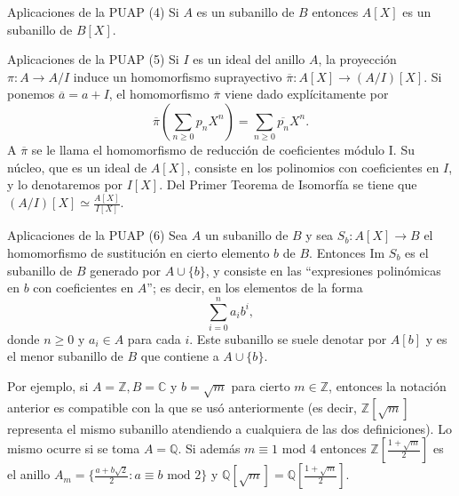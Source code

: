 \begin{example}{Aplicaciones de la PUAP (4)}{}
Si \(A\) es un subanillo de \(B\) entonces \(A[X]\) es un subanillo de \(B[X]\).
\end{example}

\begin{example}{Aplicaciones de la PUAP (5)}{}
Si \(I\) es un ideal del anillo \(A\), la proyección \(\pi : A \to A/I\) induce un homomorfismo suprayectivo \(\overline{\pi} : A[X] \to (A/I)[X]\). Si ponemos \(\overline{a} = a + I\), el homomorfismo \(\overline{\pi}\) viene dado explícitamente por \[\overline{\pi} \left( \sum_{n \geq 0} p_n X^n \right) = \sum_{n \geq 0} \overline{p_n} X^n.\] A \(\overline{\pi}\) se le llama el homomorfismo de reducción de coeficientes módulo I. Su núcleo, que es un ideal de \(A[X]\), consiste en los polinomios con coeficientes en \(I\), y lo denotaremos por \(I[X]\). Del Primer Teorema de Isomorfía se tiene que \((A/I)[X] \simeq \frac{A[X]}{I[X]}.\)
\end{example}

\begin{example}{Aplicaciones de la PUAP (6)}{}
Sea \(A\) un subanillo de \(B\) y sea \(S_b : A[X] \to B\) el homomorfismo de sustitución en cierto elemento \(b\) de \(B\). Entonces Im \(S_b\) es el subanillo de \(B\) generado por \(A \cup \{b\}\), y consiste en las ``expresiones polinómicas en \(b\) con coeficientes en \(A\)''; es decir, en los elementos de la forma \[\sum_{i=0}^{n} a_i b^i,\] donde \(n \geq 0\) y \(a_i \in A\) para cada \(i\). Este subanillo se suele denotar por \(A[b]\) y es el menor subanillo de \(B\) que contiene a \(A \cup \{b\}\).
    
Por ejemplo, si \(A = \mathbb{Z}, B = \mathbb{C}\) y \(b = \sqrt{m}\) para cierto \(m \in \mathbb{Z}\), entonces la notación anterior es compatible con la que se usó anteriormente (es decir, \(\mathbb{Z}[\sqrt{m}]\) representa el mismo subanillo atendiendo a cualquiera de las dos definiciones). Lo mismo ocurre si se toma \(A = \mathbb{Q}\). Si además \(m \equiv 1\) mod 4 entonces \(\mathbb{Z} \left[ \frac{1+\sqrt{m}}{2} \right]\) es el anillo \(A_m = \{\frac{a + b \sqrt{2}}{2} : a \equiv b \text{ mod 2}\}\) y \(\mathbb{Q}[\sqrt{m}] = \mathbb{Q} \left[ \frac{1+\sqrt{m}}{2} \right]\).
\end{example}